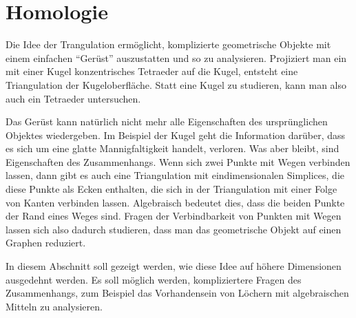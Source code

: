 %
%
%
\section{Homologie
\label{buch:section:homologie}}
Die Idee der Trangulation ermöglicht, komplizierte geometrische 
Objekte mit einem einfachen ``Gerüst'' auszustatten und so zu
analysieren. 
Projiziert man ein mit einer Kugel konzentrisches Tetraeder auf die
Kugel, entsteht eine Triangulation der Kugeloberfläche.
Statt eine Kugel zu studieren, kann man also auch ein Tetraeder untersuchen.

Das Gerüst kann natürlich nicht mehr alle Eigenschaften des ursprünglichen
Objektes wiedergeben.
Im Beispiel der Kugel geht die Information darüber, dass es sich um eine
glatte Mannigfaltigkeit handelt, verloren.
Was aber bleibt, sind Eigenschaften des Zusammenhangs.
Wenn sich zwei Punkte mit Wegen verbinden lassen, dann gibt es auch eine
Triangulation mit eindimensionalen Simplices, die diese Punkte als Ecken
enthalten, die sich in der Triangulation mit einer Folge von Kanten
verbinden lassen.
Algebraisch bedeutet dies, dass die beiden Punkte der Rand eines 
Weges sind.
Fragen der Verbindbarkeit von Punkten mit Wegen lassen sich also
dadurch studieren, dass man das geometrische Objekt auf einen Graphen
reduziert.

In diesem Abschnitt soll gezeigt werden, wie diese Idee auf höhere
Dimensionen ausgedehnt werden.
Es soll möglich werden, kompliziertere Fragen des Zusammenhangs, zum
Beispiel das Vorhandensein von Löchern mit algebraischen Mitteln
zu analysieren.






